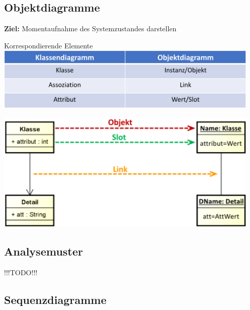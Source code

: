 \documentclass[11pt, a4paper]{article}
\begin{document}
\newpage



\raggedright \subsection{Objektdiagramme}

\textbf{Ziel:} Momentaufnahme des Systemzustandes darstellen

\vspace{2em}

\begin{minipage}[h]{0.45\textwidth}
    \tiny \centering Korrespondierende Elemente \\
    \vspace{1em}
    \centering \includegraphics[width=0.95\textwidth]{Objekt-00.png}
\end{minipage}
\begin{minipage}[h]{0.45\textwidth}
    \centering \includegraphics[width=0.95\textwidth]{Objekt-01.png}
\end{minipage}



\raggedright \subsection{Analysemuster}

!!!TODO!!!

\newpage


\raggedright \subsection{Sequenzdiagramme}
\end{document}
